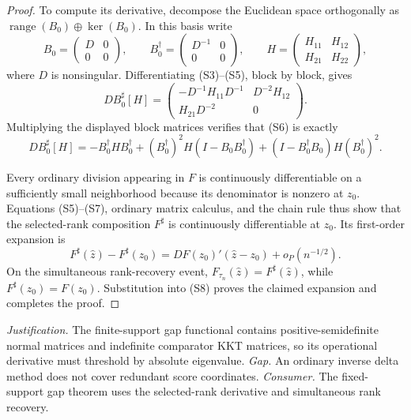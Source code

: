 \documentclass{article}
\begin{document}
\begin{proof}
To compute its derivative, decompose the Euclidean space orthogonally as \(\operatorname{range}(B_0)\oplus\ker(B_0)\).  In this basis write
\[
 B_0=\begin{pmatrix}D&0\\0&0\end{pmatrix},
 \qquad
 B_0^\dagger=\begin{pmatrix}D^{-1}&0\\0&0\end{pmatrix},
 \qquad
 H=\begin{pmatrix}H_{11}&H_{12}\\H_{21}&H_{22}\end{pmatrix},
\]
where \(D\) is nonsingular.  Differentiating (S3)--(S5), block by block, gives
\[
 DB_0^\sharp[H]
 =\begin{pmatrix}
 -D^{-1}H_{11}D^{-1}&D^{-2}H_{12}\\
 H_{21}D^{-2}&0
 \end{pmatrix}.
\tag{S6}
\]
Multiplying the displayed block matrices verifies that (S6) is exactly
\[
 DB_0^\sharp[H]
 =-B_0^\dagger HB_0^\dagger
 +(B_0^\dagger)^2H(I-B_0B_0^\dagger)
 +(I-B_0^\dagger B_0)H(B_0^\dagger)^2.
\tag{S7}
\]

Every ordinary division appearing in \(F\) is continuously differentiable on a sufficiently small neighborhood because its denominator is nonzero at \(z_0\).  Equations (S5)--(S7), ordinary matrix calculus, and the chain rule thus show that the selected-rank composition \(F^\sharp\) is continuously differentiable at \(z_0\).  Its first-order expansion is
\[
 F^\sharp(\widehat z)-F^\sharp(z_0)
 =DF(z_0)'(\widehat z-z_0)+o_P(n^{-1/2}).
\tag{S8}
\]
On the simultaneous rank-recovery event, \(F_{\tau_n}(\widehat z)=F^\sharp(\widehat z)\), while \(F^\sharp(z_0)=F(z_0)\).  Substitution into (S8) proves the claimed expansion and completes the proof.
\end{proof}
\par\smallskip\noindent \textit{Justification.} The finite-support gap functional contains positive-semidefinite normal matrices and indefinite comparator KKT matrices, so its operational derivative must threshold by absolute eigenvalue. \textit{Gap.} An ordinary inverse delta method does not cover redundant score coordinates. \textit{Consumer.} The fixed-support gap theorem uses the selected-rank derivative and simultaneous rank recovery.
\end{document}
